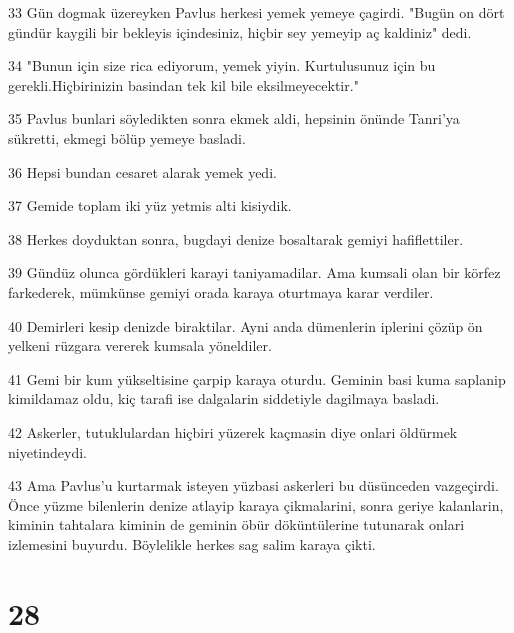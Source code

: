 \par 33 Gün dogmak üzereyken Pavlus herkesi yemek yemeye çagirdi. "Bugün on dört gündür kaygili bir bekleyis içindesiniz, hiçbir sey yemeyip aç kaldiniz" dedi.
\par 34 "Bunun için size rica ediyorum, yemek yiyin. Kurtulusunuz için bu gerekli.Hiçbirinizin basindan tek kil bile eksilmeyecektir."
\par 35 Pavlus bunlari söyledikten sonra ekmek aldi, hepsinin önünde Tanri'ya sükretti, ekmegi bölüp yemeye basladi.
\par 36 Hepsi bundan cesaret alarak yemek yedi.
\par 37 Gemide toplam iki yüz yetmis alti kisiydik.
\par 38 Herkes doyduktan sonra, bugdayi denize bosaltarak gemiyi hafiflettiler.
\par 39 Gündüz olunca gördükleri karayi taniyamadilar. Ama kumsali olan bir körfez farkederek, mümkünse gemiyi orada karaya oturtmaya karar verdiler.
\par 40 Demirleri kesip denizde biraktilar. Ayni anda dümenlerin iplerini çözüp ön yelkeni rüzgara vererek kumsala yöneldiler.
\par 41 Gemi bir kum yükseltisine çarpip karaya oturdu. Geminin basi kuma saplanip kimildamaz oldu, kiç tarafi ise dalgalarin siddetiyle dagilmaya basladi.
\par 42 Askerler, tutuklulardan hiçbiri yüzerek kaçmasin diye onlari öldürmek niyetindeydi.
\par 43 Ama Pavlus'u kurtarmak isteyen yüzbasi askerleri bu düsünceden vazgeçirdi. Önce yüzme bilenlerin denize atlayip karaya çikmalarini, sonra geriye kalanlarin, kiminin tahtalara kiminin de geminin öbür döküntülerine tutunarak onlari izlemesini buyurdu. Böylelikle herkes sag salim karaya çikti.

\chapter{28}

